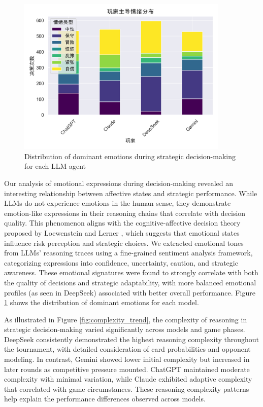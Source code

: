 \documentclass{article}
\begin{document}
\begin{figure}[H]
    \centering
    \includegraphics[width=0.9\textwidth]{figures/dominant_emotions_distribution.png}
    \caption{Distribution of dominant emotions during strategic decision-making for each LLM agent}
    \label{fig:dominant_emotions}
\end{figure}

Our analysis of emotional expressions during decision-making revealed an interesting relationship between affective states and strategic performance. While LLMs do not experience emotions in the human sense, they demonstrate emotion-like expressions in their reasoning chains that correlate with decision quality. This phenomenon aligns with the cognitive-affective decision theory proposed by Loewenstein and Lerner \cite{loewenstein2003role}, which suggests that emotional states influence risk perception and strategic choices. We extracted emotional tones from LLMs' reasoning traces using a fine-grained sentiment analysis framework, categorizing expressions into confidence, uncertainty, caution, and strategic awareness. These emotional signatures were found to strongly correlate with both the quality of decisions and strategic adaptability, with more balanced emotional profiles (as seen in DeepSeek) associated with better overall performance. Figure \ref{fig:dominant_emotions} shows the distribution of dominant emotions for each model.

As illustrated in Figure \ref{fig:complexity_trend}, the complexity of reasoning in strategic decision-making varied significantly across models and game phases. DeepSeek consistently demonstrated the highest reasoning complexity throughout the tournament, with detailed consideration of card probabilities and opponent modeling. In contrast, Gemini showed lower initial complexity but increased in later rounds as competitive pressure mounted. ChatGPT maintained moderate complexity with minimal variation, while Claude exhibited adaptive complexity that correlated with game circumstances. These reasoning complexity patterns help explain the performance differences observed across models.
\end{document}
